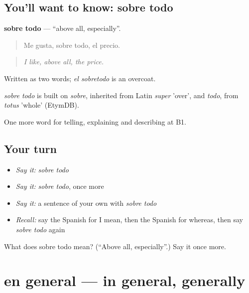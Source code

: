 \subsection*{You'll want to know: sobre todo}
\textbf{sobre todo} — \textquotedblleft{}above all, especially\textquotedblright{}.

\begin{quote}
Me gusta, sobre todo, el precio.
\end{quote}

\begin{quote}
\emph{I like, above all, the price.}
\end{quote}

Written as two words; \emph{el sobretodo} is an overcoat.

\begin{cousinweb}
\emph{sobre todo} is built on \emph{sobre}, inherited from Latin \emph{super} 'over', and \emph{todo}, from \emph{totus} 'whole' (EtymDB).
\end{cousinweb}

\begin{grammarlens}[title={What you've built}]
One more word for telling, explaining and describing at B1.
\end{grammarlens}

\subsection*{Your turn}
\begin{itemize}
\raggedright
  \item \emph{Say it:} \emph{sobre todo}
  \item \emph{Say it:} \emph{sobre todo}, once more
  \item \emph{Say it:} a sentence of your own with \emph{sobre todo}
  \item \emph{Recall:} say the Spanish for I mean, then the Spanish for whereas, then say \emph{sobre todo} again
\end{itemize}

\begin{tcolorbox}[breakable,colback=teal!4,colframe=teal!35!black,title={Before you move on}]
What does sobre todo mean? (\textquotedblleft{}Above all, especially\textquotedblright{}.) Say it once more.
\end{tcolorbox}
\section[en general]{en general — in general, generally}

